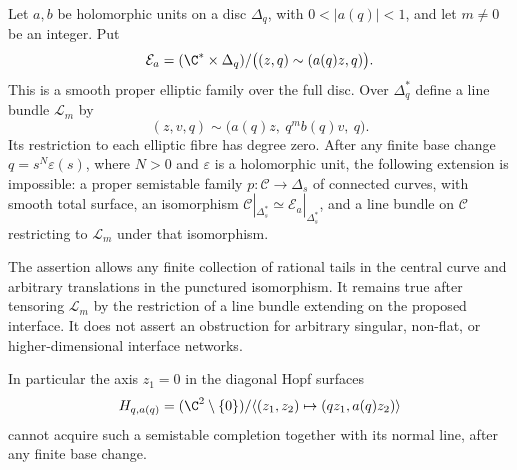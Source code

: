 \begin{proposition}\label{push:src:B.4.8}

Let $a,b$ be holomorphic units on a disc $\Delta_q$, with
$0<|a(q)|<1$, and let $m\ne0$ be an integer.  Put
\[
 \mathcal E_a=(\C^*\times\Delta_q)/
       \bigl((z,q)\sim(a(q)z,q)\bigr).
\]
This is a smooth proper elliptic family over the full disc.
Over $\Delta_q^*$ define a line bundle $\mathcal L_m$ by
\[
 (z,v,q)\sim\bigl(a(q)z,\ q^m b(q)v,\ q\bigr).
\]
Its restriction to each elliptic fibre has degree zero.
After any finite base change $q=s^N\varepsilon(s)$, where
$N>0$ and $\varepsilon$ is a holomorphic unit, the following
extension is impossible: a proper semistable family
$p:\mathcal C\to\Delta_s$ of connected curves, with smooth
total surface, an isomorphism
$\mathcal C|_{\Delta_s^*}\simeq\mathcal E_a|_{\Delta_s^*}$,
and a line bundle on $\mathcal C$ restricting to
$\mathcal L_m$ under that isomorphism.

The assertion allows any finite collection of rational tails
in the central curve and arbitrary translations in the
punctured isomorphism.  It remains true after tensoring
$\mathcal L_m$ by the restriction of a line bundle extending
on the proposed interface.  It does not assert an obstruction
for arbitrary singular, non-flat, or higher-dimensional
interface networks.

In particular the axis $z_1=0$ in the diagonal Hopf surfaces
\[
 H_{q,a(q)}=(\C^2\setminus\{0\})/
       \langle(z_1,z_2)\mapsto(qz_1,a(q)z_2)\rangle
\]
cannot acquire such a semistable completion together with
its normal line, after any finite base change.
\end{proposition}


